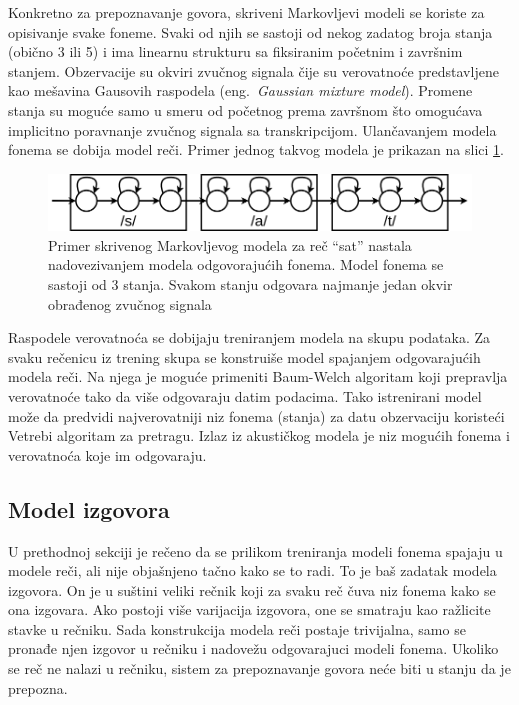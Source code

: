 \documentclass[a4paper]{article}
\begin{document}
Konkretno za prepoznavanje govora, skriveni Markovljevi modeli se koriste za opisivanje svake foneme.
Svaki od njih se sastoji od nekog zadatog broja stanja (obično 3 ili 5) i ima linearnu strukturu sa fiksiranim početnim i završnim stanjem.
Obzervacije su okviri zvučnog signala čije su verovatnoće predstavljene kao mešavina Gausovih raspodela (eng.~{\em Gaussian mixture model}).
Promene stanja su moguće samo u smeru od početnog prema završnom što omogućava implicitno poravnanje zvučnog signala sa transkripcijom.
Ulančavanjem modela fonema se dobija model reči. Primer jednog takvog modela je prikazan na slici \ref{fig:word_hmm}.

\begin{figure}[h!]
  \begin{center}
    \includegraphics[scale=0.3]{word_hmm.png}
  \end{center}
  \caption{Primer skrivenog Markovljevog modela za reč ``sat'' nastala nadovezivanjem modela odgovorajućih fonema. Model fonema se sastoji od 3 stanja. Svakom stanju odgovara najmanje jedan okvir obrađenog zvučnog signala}
  \label{fig:word_hmm}
\end{figure}

Raspodele verovatnoća se dobijaju treniranjem modela na skupu podataka.
Za svaku rečenicu iz trening skupa se konstruiše model spajanjem odgovarajućih modela reči.
Na njega je moguće primeniti Baum-Welch algoritam koji prepravlja verovatnoće tako da više odgovaraju datim podacima.
Tako istrenirani model može da predvidi najverovatniji niz fonema (stanja) za datu obzervaciju koristeći Vetrebi algoritam za pretragu.
Izlaz iz akustičkog modela je niz mogućih fonema i verovatnoća koje im odgovaraju.

\subsection{Model izgovora}
U prethodnoj sekciji je rečeno da se prilikom treniranja modeli fonema spajaju u modele reči, ali nije objašnjeno tačno kako se to radi.
To je baš zadatak modela izgovora.
On je u suštini veliki rečnik koji za svaku reč čuva niz fonema kako se ona izgovara.
Ako postoji više varijacija izgovora, one se smatraju kao ražlicite stavke u rečniku.
Sada konstrukcija modela reči postaje trivijalna, samo se pronađe njen izgovor u rečniku i nadovežu odgovarajuci modeli fonema.
Ukoliko se reč ne nalazi u rečniku, sistem za prepoznavanje govora neće biti u stanju da je prepozna.
\end{document}
